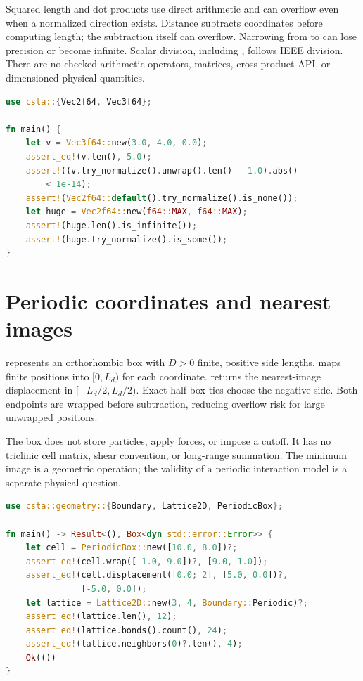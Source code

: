 \documentclass[11pt,a4paper,oneside]{report}
\newcommand{\api}[1]{\texttt{\detokenize{#1}}}
\begin{document}
Squared length and dot products use direct arithmetic and can overflow even
when a normalized direction exists. Distance subtracts coordinates before
computing length; the subtraction itself can overflow. Narrowing from \api{f64}
to \api{f32} can lose precision or become infinite. Scalar division, including
\api{/=}, follows IEEE division. There are no checked arithmetic operators,
matrices, cross-product API, or dimensioned physical quantities.

\par\noindent\begin{minipage}{\linewidth}
\begin{lstlisting}[language=Rust,caption={Vector arithmetic and explicit undefined directions.}]
use csta::{Vec2f64, Vec3f64};

fn main() {
    let v = Vec3f64::new(3.0, 4.0, 0.0);
    assert_eq!(v.len(), 5.0);
    assert!((v.try_normalize().unwrap().len() - 1.0).abs()
        < 1e-14);
    assert!(Vec2f64::default().try_normalize().is_none());
    let huge = Vec2f64::new(f64::MAX, f64::MAX);
    assert!(huge.len().is_infinite());
    assert!(huge.try_normalize().is_some());
}
\end{lstlisting}
\end{minipage}\par

\section{Periodic coordinates and nearest images}
\api{PeriodicBox<D>} represents an orthorhombic box with $D>0$ finite, positive
side lengths. \api{wrap} maps finite positions into $[0,L_d)$ for each coordinate.
\api{displacement(from, to)} returns the nearest-image displacement in
$[-L_d/2,L_d/2)$. Exact half-box ties choose the negative side. Both endpoints are
wrapped before subtraction, reducing overflow risk for large unwrapped positions.

The box does not store particles, apply forces, or impose a cutoff. It has no
triclinic cell matrix, shear convention, or long-range summation. The minimum
image is a geometric operation; the validity of a periodic interaction model is
a separate physical question.

\par\noindent\begin{minipage}{\linewidth}
\begin{lstlisting}[language=Rust,caption={Periodic geometry and unique lattice bonds.}]
use csta::geometry::{Boundary, Lattice2D, PeriodicBox};

fn main() -> Result<(), Box<dyn std::error::Error>> {
    let cell = PeriodicBox::new([10.0, 8.0])?;
    assert_eq!(cell.wrap([-1.0, 9.0])?, [9.0, 1.0]);
    assert_eq!(cell.displacement([0.0; 2], [5.0, 0.0])?,
               [-5.0, 0.0]);
    let lattice = Lattice2D::new(3, 4, Boundary::Periodic)?;
    assert_eq!(lattice.len(), 12);
    assert_eq!(lattice.bonds().count(), 24);
    assert_eq!(lattice.neighbors(0)?.len(), 4);
    Ok(())
}
\end{lstlisting}
\end{minipage}\par
\end{document}
